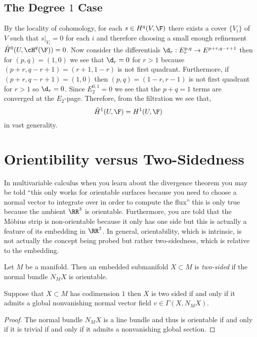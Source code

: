 \documentclass[12pt]{article}
\begin{document}
\subsection{The Degree $1$ Case}

By the locality of cohomology, for each $s \in H^q(V, \F)$ there exists a cover $\{ V_i \}$ of $V$ such that $s|_{V_i} = 0$ for each $i$ and therefore choosing a small enough refinement $\cechH^0(U, \cH^q(\F)) = 0$. Now consider the differentials $\d_r : E^{p,q}_r \to E^{p+r,q - r + 1}$ then for $(p,q) = (1,0)$ we see that $\d_r = 0$ for $r > 1$ because $(p+r, q-r+1) = (r+1, 1-r)$ is not first quadrant. Furthermore, if $(p+r,q-r+1) = (1,0)$ then $(p,q) = (1-r,r-1)$ is not first quadrant for $r > 1$ so $\d_r = 0$. Since $E^{0,1}_2 = 0$ we see that the $p + q = 1$ terms are converged at the $E_2$-page. Therefore, from the filtration we see that,
\[ \cechH^1(U, \F) = H^1(U, \F) \]
in vast generality.

\section{Orientibility versus Two-Sidedness}

In multivariable calculus when you learn about the divergence theorem you may be told ``this only works for orientable surfaces because you need to choose a normal vector to integrate over in order to compute the flux'' this is only true because the ambient $\RR^3$ is orientable. Furthermore, you are told that the M\"{o}bius strip is non-orientable because it only has one side but this is actually a feature of its embedding in $\RR^3$. In general, orientability, which is intrinsic, is not actually the concept being probed but rather two-sidedness, which is relative to the embedding.

\begin{defn}
Let $M$ be a manifold. Then an embedded submanifold $X \subset M$ is \textit{two-sided} if the normal bundle $N_M X$ is orientable.
\end{defn}

\begin{prop}
Suppose that $X \subset M$ has codimension $1$ then $X$ is two sided if and only if it admits a global nonvanishing normal vector field $v \in \Gamma(X, N_M X)$.
\end{prop}

\begin{proof}
The normal bundle $N_M X$ is a line bundle and thus is orientable if and only if it is trivial if and only if it admits a nonvanishing global section.
\end{proof}
\end{document}
